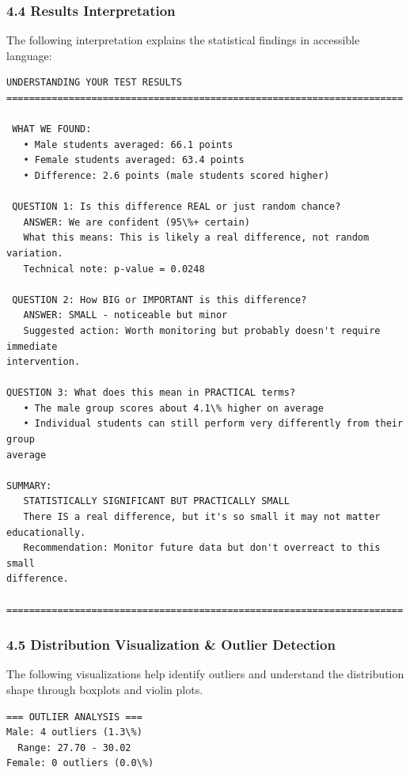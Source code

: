 \documentclass[11pt]{article}
\begin{document}
    \subsubsection{4.4 Results Interpretation}\label{results-interpretation}

The following interpretation explains the statistical findings in
accessible language:

    \begin{Verbatim}[commandchars=\\\{\}]
UNDERSTANDING YOUR TEST RESULTS
======================================================================

 WHAT WE FOUND:
   • Male students averaged: 66.1 points
   • Female students averaged: 63.4 points
   • Difference: 2.6 points (male students scored higher)

 QUESTION 1: Is this difference REAL or just random chance?
   ANSWER: We are confident (95\%+ certain)
   What this means: This is likely a real difference, not random variation.
   Technical note: p-value = 0.0248

 QUESTION 2: How BIG or IMPORTANT is this difference?
   ANSWER: SMALL - noticeable but minor
   Suggested action: Worth monitoring but probably doesn't require immediate
intervention.

QUESTION 3: What does this mean in PRACTICAL terms?
   • The male group scores about 4.1\% higher on average
   • Individual students can still perform very differently from their group
average

SUMMARY:
   STATISTICALLY SIGNIFICANT BUT PRACTICALLY SMALL
   There IS a real difference, but it's so small it may not matter
educationally.
   Recommendation: Monitor future data but don't overreact to this small
difference.

======================================================================
    \end{Verbatim}

    \subsubsection{4.5 Distribution Visualization \& Outlier
Detection}\label{distribution-visualization-outlier-detection}

The following visualizations help identify outliers and understand the
distribution shape through boxplots and violin plots.

    \begin{Verbatim}[commandchars=\\\{\}]
=== OUTLIER ANALYSIS ===
Male: 4 outliers (1.3\%)
  Range: 27.70 - 30.02
Female: 0 outliers (0.0\%)
    \end{Verbatim}
\end{document}
